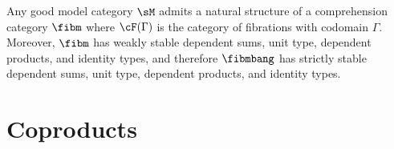\documentclass{amsart}
\begin{document}
\begin{thm}
  Any good model category $\sM$ admits a natural structure of a comprehension category $\fibm$ where $\cF(\Gamma)$ is the category of fibrations with codomain $\Gamma$.
  Moreover, $\fibm$ has weakly stable dependent sums, unit type, dependent products, and identity types, and therefore $\fibmbang$ has strictly stable dependent sums, unit type, dependent products, and identity types.
\end{thm}







\section{Coproducts}
\label{sec:coproducts}
\end{document}
